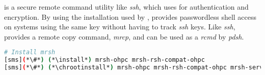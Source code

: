 \mrsh{} is a secure remote command utility like {\em ssh}, which uses
\MUNGE{} for authentication and encryption. By using the \MUNGE{}
installation used by \SLURM{}, \mrsh{} provides passwordless shell
access on systems using the same \MUNGE{} key without having to track
{\em ssh} keys. Like {\em ssh}, \mrsh{} provides a remote copy command,
{\em mrcp}, and can be used as a {\em rcmd} by {\em pdsh}.

\begin{lstlisting}[language=bash,keywords={},upquote=true]
# Install mrsh
[sms](*\#*) (*\install*) mrsh-ohpc mrsh-rsh-compat-ohpc
[sms](*\#*) (*\chrootinstall*) mrsh-ohpc mrsh-rsh-compat-ohpc mrsh-server-ohpc
\end{lstlisting}

